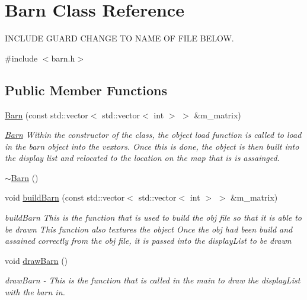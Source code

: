 \hypertarget{classBarn}{
\section{Barn Class Reference}
\label{classBarn}
}


INCLUDE GUARD CHANGE TO NAME OF FILE BELOW.  


{\ttfamily \#include $<$barn.h$>$}\subsection*{Public Member Functions}
\begin{DoxyCompactItemize}
\item 
\hyperlink{classBarn_a0b6de6424f6b740a356e1ea8c6e24eb9}{Barn} (const std::vector$<$ std::vector$<$ int $>$ $>$ \&m\_\-matrix)
\begin{DoxyCompactList}\small\item\em \hyperlink{classBarn}{Barn} Within the constructor of the class, the object load function is called to load in the barn object into the vextors. Once this is done, the object is then built into the display list and relocated to the location on the map that is is assainged. \item\end{DoxyCompactList}\item 
\hyperlink{classBarn_a24235aae94c8da869b27b02c07f2420e}{$\sim$Barn} ()
\item 
void \hyperlink{classBarn_a93eaee9dc2054c8aaecd39e859f5dc29}{buildBarn} (const std::vector$<$ std::vector$<$ int $>$ $>$ \&m\_\-matrix)
\begin{DoxyCompactList}\small\item\em buildBarn This is the function that is used to build the obj file so that it is able to be drawn This function also textures the object Once the obj had been build and assained correctly from the obj file, it is passed into the displayList to be drawn \item\end{DoxyCompactList}\item 
\hypertarget{classBarn_a7029c8dad4d18e7ead4515a9d54124cb}{
void \hyperlink{classBarn_a7029c8dad4d18e7ead4515a9d54124cb}{drawBarn} ()}
\label{classBarn_a7029c8dad4d18e7ead4515a9d54124cb}

\begin{DoxyCompactList}\small\item\em drawBarn -\/ This is the function that is called in the main to draw the displayList with the barn in. \item\end{DoxyCompactList}\end{DoxyCompactItemize}
